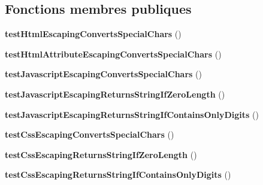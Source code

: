 \subsection*{Fonctions membres publiques}
\begin{DoxyCompactItemize}
\item 
{\bfseries test\+Html\+Escaping\+Converts\+Special\+Chars} ()\hypertarget{class_twig___test___escaping_test_a6b3bc0849056493e46d3fc23def6001f}{}\label{class_twig___test___escaping_test_a6b3bc0849056493e46d3fc23def6001f}

\item 
{\bfseries test\+Html\+Attribute\+Escaping\+Converts\+Special\+Chars} ()\hypertarget{class_twig___test___escaping_test_a1dec032161b7ff4b81ebefda4211c71c}{}\label{class_twig___test___escaping_test_a1dec032161b7ff4b81ebefda4211c71c}

\item 
{\bfseries test\+Javascript\+Escaping\+Converts\+Special\+Chars} ()\hypertarget{class_twig___test___escaping_test_aaf9085235a6e28490f623bab42a9d014}{}\label{class_twig___test___escaping_test_aaf9085235a6e28490f623bab42a9d014}

\item 
{\bfseries test\+Javascript\+Escaping\+Returns\+String\+If\+Zero\+Length} ()\hypertarget{class_twig___test___escaping_test_a507b86149f243aebf1acef693de5a530}{}\label{class_twig___test___escaping_test_a507b86149f243aebf1acef693de5a530}

\item 
{\bfseries test\+Javascript\+Escaping\+Returns\+String\+If\+Contains\+Only\+Digits} ()\hypertarget{class_twig___test___escaping_test_ac6b8e44d967f936cbdb8e2eec4a35a2f}{}\label{class_twig___test___escaping_test_ac6b8e44d967f936cbdb8e2eec4a35a2f}

\item 
{\bfseries test\+Css\+Escaping\+Converts\+Special\+Chars} ()\hypertarget{class_twig___test___escaping_test_a2bbdcf10a64cd67570f1f8f8562299d4}{}\label{class_twig___test___escaping_test_a2bbdcf10a64cd67570f1f8f8562299d4}

\item 
{\bfseries test\+Css\+Escaping\+Returns\+String\+If\+Zero\+Length} ()\hypertarget{class_twig___test___escaping_test_aeafffa4c484746c72a10efff83b5c0fb}{}\label{class_twig___test___escaping_test_aeafffa4c484746c72a10efff83b5c0fb}

\item 
{\bfseries test\+Css\+Escaping\+Returns\+String\+If\+Contains\+Only\+Digits} ()\hypertarget{class_twig___test___escaping_test_aa180a7dc43fd95bac835fe552a8de01c}{}\label{class_twig___test___escaping_test_aa180a7dc43fd95bac835fe552a8de01c}


\end{DoxyCompactItemize}
